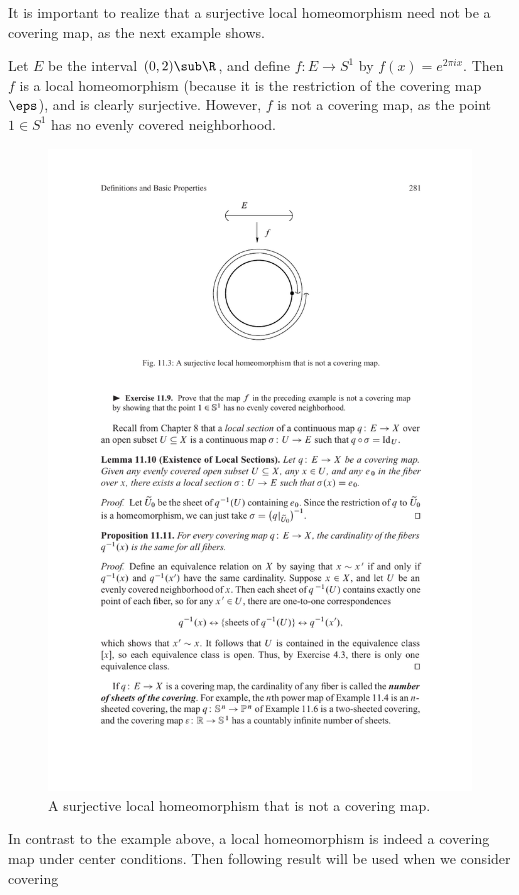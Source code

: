 It is important to realize that a surjective local homeomorphism need not be a
covering map, as the next example shows.
\begin{example}
Let $E$ be the interval $(0,2)\sub\R$, and define $f:E\to S^1$ by $f(x)=e^{2\pi ix}$. Then $f$ is 
a local homeomorphism (because it is the restriction of the covering map $\eps$), and is clearly 
surjective. However, $f$ is not a covering map, as the point $1\in S^1$ has no evenly covered neighborhood.
\begin{figure}[htbp]
\centering
\includegraphics{pictures/covering-counter}
\caption{A surjective local homeomorphism that is not a covering map.}
\end{figure}
\end{example}
In contrast to the example above, a local homeomorphism is indeed a covering map under center conditions. Then following result will be used when we consider covering 
